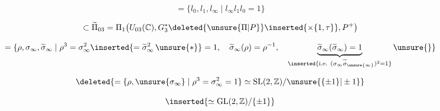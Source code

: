 \[
=\{l_0,l_1,l_\infty\mid l_\infty l_1l_0=1\}
\]

\[
\subset\widetilde\Pi_{03}=\Pi_1\bigl(U_{03}(\mathbb C),G_3^*\deleted{\unsure{\Pi|P}}\inserted{\times\{1,\tau\}},P^+\bigr)
\]

\[
=\{\rho,\sigma_\infty,\widetilde\sigma_\infty\mid
\rho^3=\sigma_\infty^2\inserted{=\widetilde\sigma_\infty^2\,\unsure{*}}=1,\quad
\widetilde\sigma_\infty(\rho)=\rho^{-1},\quad
\underbrace{\widetilde\sigma_\infty(\widetilde\sigma_\infty)=1}_{\inserted{\text{i.e. }(\sigma_\infty\widetilde\sigma_{\unsure{\infty}})^2=1}}\unsure{\}}
\]

\[
\deleted{=\{\rho,\unsure{\sigma_\infty}\mid\rho^3=\sigma_\infty^2=1\}\simeq\operatorname{SL}(2,\mathbb Z)/\unsure{\{\pm1\}|\pm1}}
\]

\[
\inserted{\simeq\operatorname{GL}(2,\mathbb Z)/\{\pm1\}}
\]



